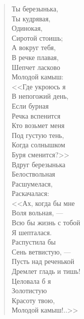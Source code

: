 \newpage
\vspace*{0cm}

\begin{verse}
\begin{altverse}
Ты березынька,\\
    Ты кудрявая,\\
Одинокая,\\
    Сиротой стоишь;\\
А вокруг тебя,\\
    В речке плавая,\\
Шепчет ласково\\
    Молодой камыш:\\
<<Где укроюсь я\\
    В непогожий день,\\
Если бурная\\
    Речка вспенится\ldotse\\
Кто возьмет меня\\
    Под густую тень,\\
Когда солнышком\\
    Буря сменится?>>\\
Вдруг березынька\\
    Белоствольная\\
Расшумелася,\\
    Раскачалася:\\
<<Ах, когда бы мне\\
    Воля вольная, ---\\
Всю бы жизнь с тобой\\
    Я шепталася.\\
Распустила бы\\
    Сень ветвистую, ---\\
Пусть над реченькой\\
    Дремлет гладь и тишь!\\
Целовала б я\\
    Золотистую\\
Красоту твою,\\
    Молодой камыш!..>>
\end{altverse}
\end{verse}

\newpage
\vspace*{0cm}

